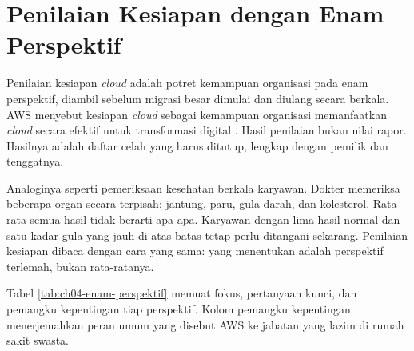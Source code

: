 \section{Penilaian Kesiapan dengan Enam Perspektif}
\label{sec:ch04-kesiapan}

Penilaian kesiapan \textit{cloud} adalah potret kemampuan organisasi pada enam perspektif,
diambil sebelum migrasi besar dimulai dan diulang secara berkala. AWS menyebut kesiapan
\textit{cloud} sebagai kemampuan organisasi memanfaatkan \textit{cloud} secara efektif
untuk transformasi digital \cite{c04-aws-caf-capabilities}. Hasil penilaian bukan nilai
rapor. Hasilnya adalah daftar celah yang harus ditutup, lengkap dengan pemilik dan
tenggatnya.

Analoginya seperti pemeriksaan kesehatan berkala karyawan. Dokter memeriksa beberapa organ
secara terpisah: jantung, paru, gula darah, dan kolesterol. Rata-rata semua hasil tidak
berarti apa-apa. Karyawan dengan lima hasil normal dan satu kadar gula yang jauh di atas batas
tetap perlu ditangani sekarang. Penilaian kesiapan dibaca dengan cara yang sama: yang
menentukan adalah perspektif terlemah, bukan rata-ratanya.

Tabel \ref{tab:ch04-enam-perspektif} memuat fokus, pertanyaan kunci, dan pemangku
kepentingan tiap perspektif. Kolom pemangku kepentingan menerjemahkan peran umum yang
disebut AWS \cite{c04-aws-caf-capabilities} ke jabatan yang lazim di rumah sakit swasta.

